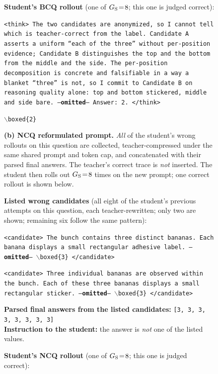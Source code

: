 \documentclass{llmxive}
\begin{document}
\begin{figure}[!p]
\begin{prompttemplatefig}
\textbf{Student's BCQ rollout} (one of $G_{\rm S}\!=\!8$; this one is judged correct):

\smallskip
\texttt{<think> The two candidates are anonymized, so I cannot tell which is teacher-correct from the label. Candidate~A asserts a uniform ``each of the three'' without per-position evidence; Candidate~B distinguishes the top and the bottom from the middle and the side. The per-position decomposition is concrete and falsifiable in a way a blanket ``three'' is not, so I commit to Candidate~B on reasoning quality alone: top and bottom stickered, middle and side bare. ---\textbf{omitted}--- Answer: 2. </think>}

\smallskip
\texttt{$\backslash$boxed\{2\}} \quad \checkmark
\end{prompttemplatefig}

\vspace{1pt}\noindent\textbf{(b) NCQ reformulated prompt.} \emph{All} of the student's wrong rollouts on this question are collected, teacher-compressed under the same shared prompt and token cap, and concatenated with their parsed final answers. The teacher's correct trace is \emph{not} inserted. The student then rolls out $G_{\rm S}\!=\!8$ times on the new prompt; one correct rollout is shown below.

\begin{negcandidatebox}
\textbf{Listed wrong candidates} (all eight of the student's previous attempts on this question, each teacher-rewritten; only two are shown; remaining six follow the same pattern):

\smallskip
\texttt{<candidate> The bunch contains three distinct bananas. Each banana displays a small rectangular adhesive label. ---\textbf{omitted}--- $\backslash$boxed\{3\} </candidate>}

\smallskip
\texttt{<candidate> Three individual bananas are observed within the bunch. Each of these three bananas displays a small rectangular sticker. ---\textbf{omitted}--- $\backslash$boxed\{3\} </candidate>}

\smallskip
\textbf{Parsed final answers from the listed candidates:} \texttt{[3, 3, 3, 3, 3, 3, 3, 3]} \\
\textbf{Instruction to the student:} the answer is \emph{not} one of the listed values.
\end{negcandidatebox}

\begin{prompttemplatefig}
\textbf{Student's NCQ rollout} (one of $G_{\rm S}\!=\!8$; this one is judged correct):


\end{prompttemplatefig}
\end{figure}
\end{document}

